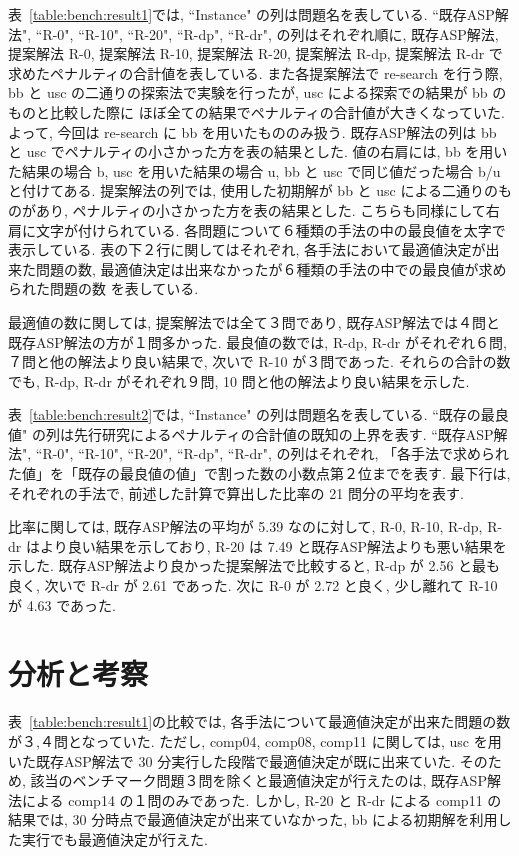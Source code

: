 表~\ref{table:bench:result1}では, ``Instance" の列は問題名を表している. 
``既存ASP解法", ``R-0", ``R-10", ``R-20", ``R-dp", ``R-dr", の列はそれぞれ順に, 
既存ASP解法, 提案解法 R-0, 提案解法 R-10, 提案解法 R-20, 提案解法 R-dp, 提案解法 R-dr 
で求めたペナルティの合計値を表している. 
また各提案解法で re-search を行う際, bb と usc の二通りの探索法で実験を行ったが, 
usc による探索での結果が bb のものと比較した際に
ほぼ全ての結果でペナルティの合計値が大きくなっていた. 
よって, 今回は re-search に bb を用いたもののみ扱う. 
既存ASP解法の列は bb と usc でペナルティの小さかった方を表の結果とした. 
値の右肩には, bb を用いた結果の場合 b, 
usc を用いた結果の場合 u, 
bb と usc で同じ値だった場合 b/u と付けてある. 
提案解法の列では, 使用した初期解が bb と usc による二通りのものがあり, 
ペナルティの小さかった方を表の結果とした. 
こちらも同様にして右肩に文字が付けられている. 
各問題について６種類の手法の中の最良値を太字で表示している. 
表の下２行に関してはそれぞれ, 
各手法において最適値決定が出来た問題の数, 
最適値決定は出来なかったが６種類の手法の中での最良値が求められた問題の数
を表している.

最適値の数に関しては, 
提案解法では全て３問であり, 
既存ASP解法では４問と既存ASP解法の方が１問多かった. 
最良値の数では, R-dp, R-dr がそれぞれ６問, ７問と他の解法より良い結果で, 
次いで R-10 が３問であった. 
それらの合計の数でも, R-dp, R-dr がそれぞれ９問, 
10 問と他の解法より良い結果を示した. 

表~\ref{table:bench:result2}では, ``Instance" の列は問題名を表している. 
``既存の最良値" の列は先行研究によるペナルティの合計値の既知の上界を表す. 
``既存ASP解法", ``R-0", ``R-10", ``R-20", ``R-dp", ``R-dr", の列はそれぞれ, 
「各手法で求められた値」を「既存の最良値の値」で割った数の小数点第２位までを表す. 
最下行は, それぞれの手法で, 前述した計算で算出した比率の 21 問分の平均を表す.

比率に関しては, 既存ASP解法の平均が 5.39 なのに対して, 
R-0, R-10, R-dp, R-dr はより良い結果を示しており, 
R-20 は 7.49 と既存ASP解法よりも悪い結果を示した. 
既存ASP解法より良かった提案解法で比較すると, 
R-dp が 2.56 と最も良く, 次いで R-dr が 2.61 であった. 
次に R-0 が 2.72 と良く, 少し離れて R-10 が 4.63 であった.

\section{分析と考察}

表~\ref{table:bench:result1}の比較では, 
各手法について最適値決定が出来た問題の数が３,４問となっていた. 
ただし, comp04, comp08, comp11 に関しては, usc を用いた既存ASP解法で 30 分実行した段階で最適値決定が既に出来ていた. 
そのため, 該当のベンチマーク問題３問を除くと最適値決定が行えたのは, 
既存ASP解法による comp14 の１問のみであった. 
しかし, R-20 と R-dr による comp11 の結果では, 30 分時点で最適値決定が出来ていなかった, 
bb による初期解を利用した実行でも最適値決定が行えた.

